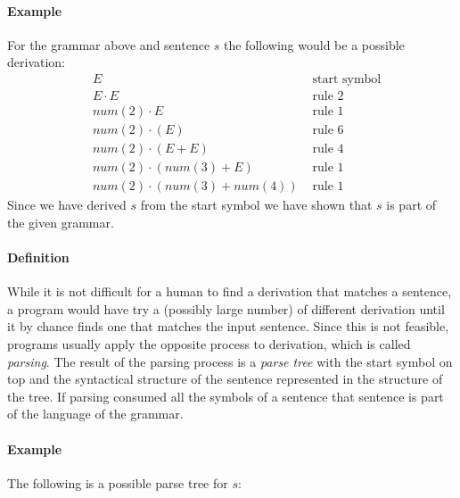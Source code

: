 \documentclass[11pt]{article}
\begin{document}
\paragraph{Example}
For the grammar above and sentence $s$ the following would be a possible derivation:
\begin{align*}
& E & \mbox{ start symbol} \\
& E\cdot E & \mbox{ rule 2} \\
& num(2)\cdot E & \mbox{ rule 1} \\
& num(2)\cdot(E) & \mbox{ rule 6} \\
& num(2)\cdot(E+E) & \mbox{ rule 4} \\
& num(2)\cdot(num(3)+E) & \mbox{ rule 1} \\
& num(2)\cdot(num(3)+num(4)) & \mbox{ rule 1}
\end{align*}
Since we have derived $s$ from the start symbol we have shown that $s$ is part of the given grammar.

\paragraph{Definition}
While it is not difficult for a human to find a derivation that matches a sentence, a program would have try a (possibly large number) of different derivation until it by chance finds one that matches the input sentence. Since this is not feasible, programs usually apply the opposite process to derivation, which is called \emph{parsing}. The result of the parsing process is a \emph{parse tree} with the start symbol on top and the syntactical structure of the sentence represented in the structure of the tree. If parsing consumed all the symbols of a sentence that sentence is part of the language of the grammar.

\paragraph{Example}
The following is a possible parse tree for $s$:\\
\end{document}
